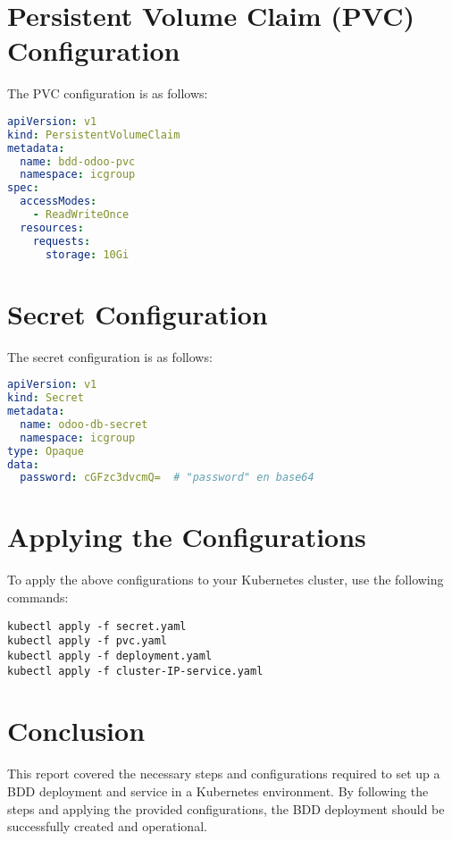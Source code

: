 \documentclass{article}
\begin{document}
\section{Persistent Volume Claim (PVC) Configuration}
The PVC configuration is as follows:

\begin{lstlisting}[language=yaml]
apiVersion: v1
kind: PersistentVolumeClaim
metadata:
  name: bdd-odoo-pvc
  namespace: icgroup
spec:
  accessModes:
    - ReadWriteOnce
  resources:
    requests:
      storage: 10Gi

\end{lstlisting}

\section{Secret Configuration}
The secret configuration is as follows:

\begin{lstlisting}[language=yaml]
apiVersion: v1
kind: Secret
metadata:
  name: odoo-db-secret
  namespace: icgroup
type: Opaque
data:
  password: cGFzc3dvcmQ=  # "password" en base64
\end{lstlisting}

\section{Applying the Configurations}
To apply the above configurations to your Kubernetes cluster, use the following commands:

\begin{verbatim}
kubectl apply -f secret.yaml
kubectl apply -f pvc.yaml
kubectl apply -f deployment.yaml
kubectl apply -f cluster-IP-service.yaml
\end{verbatim}

\section{Conclusion}
This report covered the necessary steps and configurations required to set up a BDD deployment and service in a Kubernetes environment. By following the steps and applying the provided configurations, the BDD deployment should be successfully created and operational.
\end{document}
